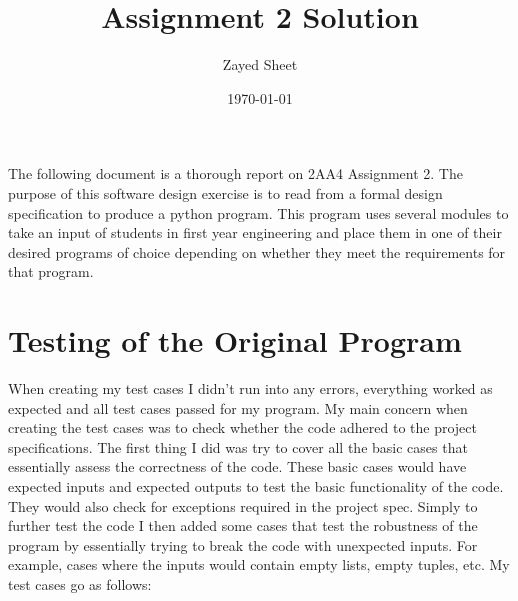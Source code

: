 \documentclass[12pt]{article}
\title{Assignment 2 Solution}
\author{Zayed Sheet}
\date{\today}
\begin{document}
\maketitle

The following document is a thorough report on 2AA4 Assignment 2. The purpose of this software design exercise is to read from a formal design specification to produce a python program. This program uses several modules to take an input of students in first year engineering and place them in one of their desired programs of choice depending on whether they meet the requirements for that program.

\section{Testing of the Original Program}

When creating my test cases I didn't run into any errors, everything worked as expected and all test cases passed for my program. My main concern when creating the test cases was to check whether the code adhered to the project specifications. The first thing I did was try to cover all the basic cases that essentially assess the correctness of the code. These basic cases would have expected inputs and expected outputs to test the basic functionality of the code. They would also check for exceptions required in the project spec. Simply to further test the code I then added some cases that test the robustness of the program by essentially trying to break the code with unexpected inputs.
For example, cases where the inputs would contain empty lists, empty tuples, etc. My test cases go as follows:
\end{document}
